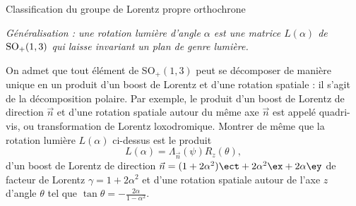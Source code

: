 \begin{exo}[PC][3][TD]{Classification du groupe de Lorentz propre orthochrone}
\begin{quest}
    \begin{center}
      \emph{Généralisation : une rotation lumière d'angle $\alpha$ est une matrice $L(\alpha)$ de ${\rm SO}_+(1,3)$ qui laisse invariant un plan de genre lumière.}
    \end{center}
    \item On admet que tout élément de SO$_+(1,3)$ peut se décomposer de manière unique en un produit d'un boost de Lorentz et d'une rotation spatiale : il s'agit de la décomposition polaire. Par exemple, le produit d'un boost de Lorentz de direction $\Vec{n}$ et d'une rotation spatiale autour du même axe $\Vec{n}$ est appelé quadri-vis, ou transformation de Lorentz loxodromique. Montrer de même que la rotation lumière $L(\alpha)$ ci-dessus est le produit  
    \begin{equation}
    L(\alpha) = \Lambda_{\Vec{n}}(\psi)  R_{z}(\theta) ,
    \end{equation}
    d'un boost de Lorentz de direction $\Vec{n} = (1+2\alpha^2)\ect + 2\alpha^2\ex + 2\alpha \ey$ de facteur de Lorentz $\gamma = 1+2\alpha^2$ et d'une rotation spatiale autour de l'axe $z$ d'angle $\theta$ tel que $\tan \theta = -\frac{2\alpha}{1-\alpha^2}$.
    \end{quest}
\end{exo}

